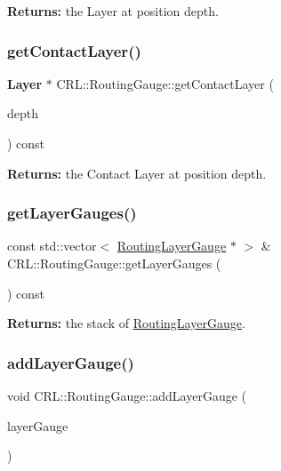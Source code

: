 {\bfseries Returns\+:} the Layer at position {\ttfamily depth}. \mbox{\label{classCRL_1_1RoutingGauge_a4b603c0fd5f21db1c93d8a747ec1f4ba}} 
\subsubsection{\texorpdfstring{get\+Contact\+Layer()}{getContactLayer()}}
{\footnotesize\ttfamily \textbf{ Layer} $\ast$ C\+R\+L\+::\+Routing\+Gauge\+::get\+Contact\+Layer (\begin{DoxyParamCaption}\item[{size\+\_\+t}]{depth }\end{DoxyParamCaption}) const}

{\bfseries Returns\+:} the Contact Layer at position {\ttfamily depth}. \mbox{\label{classCRL_1_1RoutingGauge_ae8cebef061519fb2df94e3a9dcf09e6e}} 
\subsubsection{\texorpdfstring{get\+Layer\+Gauges()}{getLayerGauges()}}
{\footnotesize\ttfamily const std\+::vector$<$ \mbox{\hyperlink{classCRL_1_1RoutingLayerGauge}{Routing\+Layer\+Gauge}} $\ast$ $>$ \& C\+R\+L\+::\+Routing\+Gauge\+::get\+Layer\+Gauges (\begin{DoxyParamCaption}{ }\end{DoxyParamCaption}) const}

{\bfseries Returns\+:} the stack of \mbox{\hyperlink{classCRL_1_1RoutingLayerGauge}{Routing\+Layer\+Gauge}}. \mbox{\label{classCRL_1_1RoutingGauge_a32313fbc68080e0b7e03b3e06dc1d9c5}} 
\subsubsection{\texorpdfstring{add\+Layer\+Gauge()}{addLayerGauge()}}
{\footnotesize\ttfamily void C\+R\+L\+::\+Routing\+Gauge\+::add\+Layer\+Gauge (\begin{DoxyParamCaption}\item[{\mbox{\hyperlink{classCRL_1_1RoutingLayerGauge}{Routing\+Layer\+Gauge}} $\ast$}]{layer\+Gauge }\end{DoxyParamCaption})}

